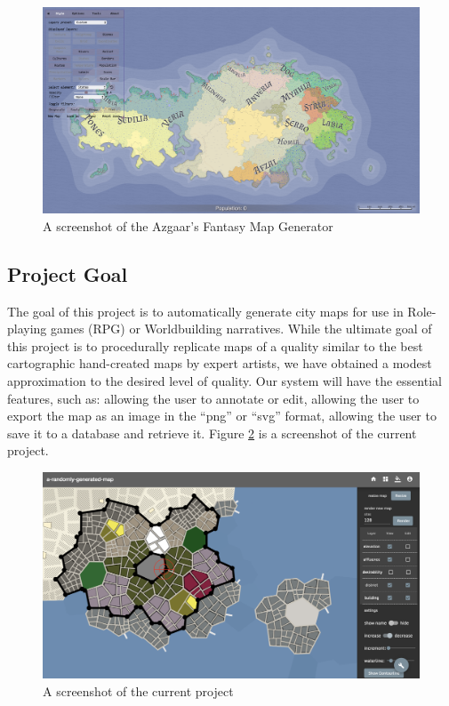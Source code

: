 \begin{figure}[!htb]
\centering
\includegraphics[width=\textwidth]{section01/assets/screenshot_FMG.png}
\caption[A screenshot of the Azgaar's Fantasy Map Generator]{\label{Screenshot FMG}A screenshot of the Azgaar's Fantasy Map Generator}
\end{figure}

\subsection{Project Goal}
The goal of this project is to automatically generate city maps for use in Role-playing games (RPG) or Worldbuilding narratives. While the ultimate goal of this project is to procedurally replicate maps of a quality similar to the best cartographic hand-created maps by expert artists, we have obtained a modest approximation to the desired level of quality. Our system will have the essential features, such as: allowing the user to annotate or edit, allowing the user to export the map as an image in the ``png'' or ``svg'' format, allowing the user to save it to a database and retrieve it. Figure \ref{Screenshot Metropolist} is a screenshot of the current project.

\begin{figure}[!htb]
\centering
\includegraphics[width=\textwidth]{section01/assets/screenshot_Metropolist.png}
\caption[A screenshot of the current project]{\label{Screenshot Metropolist}A screenshot of the current project}
\end{figure}
